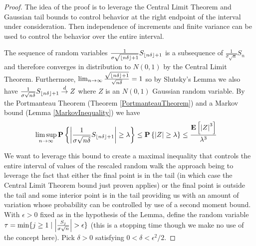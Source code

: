 \begin{proof}
The idea of the proof is to leverage the Central Limit Theorem and
Gaussian tail bounds to control behavior at the right endpoint of the
interval under consideration.  Then independence of increments and
finite variance can be used to control the behavior over the entire
interval.

The sequence of random variables $\frac{1}{\sigma
  \sqrt{\left \lfloor n\delta \right \rfloor+1}}S_{\left \lfloor n\delta \right \rfloor+1}$ is a subsequence of
$\frac{1}{\sigma\sqrt{n}}S_n$ and therefore converges in distribution
to $N(0,1)$ by the Central Limit Theorem.  Furthermore, $\lim_{n \to
  \infty} \frac{\sqrt{\left \lfloor n\delta \right \rfloor+1}}{\sqrt{n\delta}} = 1$ so by
Slutsky's Lemma we also have $\frac{1}{\sigma\sqrt{n\delta}}
S_{\left \lfloor n\delta \right \rfloor+1} \overset{d}\to Z$ where $Z$ is an $N(0,1)$ Gaussian
random variable.  By the Portmanteau Theorem (Theorem
\ref{PortmanteauTheorem}) and
a Markov bound (Lemma \ref{MarkovInequality}) we have
\begin{align*}
\limsup_{n \to \infty}
\textbf{P}\left \{\left \vert \frac{1}{\sigma\sqrt{n\delta}}S_{\left \lfloor n\delta \right \rfloor+1} \right \vert
  \geq \lambda \right \} &\leq \textbf{P}\left \{\left \vert Z \right \vert  \geq \lambda \right \} \leq \frac{\textbf{E}\left[\left \vert Z \right \vert^3\right]}{\lambda^3}
\end{align*}

We want to leverage this bound to create a maximal inequality that controls the entire interval of
values of the rescaled random walk the approach being to leverage the
fact that either the final point is in the tail (in which
case the Central Limit Theorem bound just proven applies) or the final
point is outside the tail and some interior point is in the tail
providing us with an amount of variation whose probability can be
controlled by use of a second moment bound.  With $\epsilon > 0$ fixed as in
the hypothesis of the Lemma, define the random variable $\tau
= \min \lbrace j \geq 1 \mid \left \vert \frac{S_j}{\sigma\sqrt{n}}  \right \vert >
\epsilon\rbrace$ (this is a stopping time though we make no use of the
concept here).  Pick $\delta > 0$ satisfying $0 < \delta <
\epsilon^2/2$.


\end{proof}
